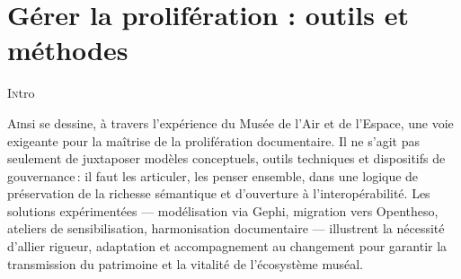 \chapter[Gérer la prolifération]{\label{III-A} Gérer la prolifération : outils et méthodes}



\lettrine{I}ntro







\bigskip
\bigskip
\bigskip

\lettrine{A}insi se dessine, à travers l’expérience du Musée de l’Air et de l’Espace, une voie exigeante pour la maîtrise de la prolifération documentaire. Il ne s’agit pas seulement de juxtaposer modèles conceptuels, outils techniques et dispositifs de gouvernance : il faut les articuler, les penser ensemble, dans une logique de préservation de la richesse sémantique et d’ouverture à l’interopérabilité. Les solutions expérimentées — modélisation via Gephi, migration vers Opentheso, ateliers de sensibilisation, harmonisation documentaire — illustrent la nécessité d’allier rigueur, adaptation et accompagnement au changement pour garantir la transmission du patrimoine et la vitalité de l’écosystème muséal.